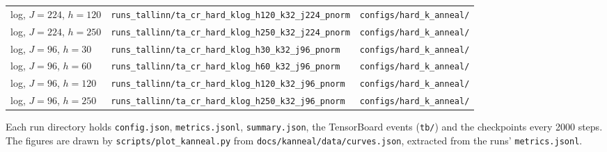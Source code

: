 \documentclass[11pt,a4paper]{article}
\newcommand{\code}[1]{\texttt{#1}}
\begin{document}
\begin{center}
\begin{tabular}{lll}
log, $J = 224$, $h = 120$ & \code{runs\_tallinn/ta\_cr\_hard\_klog\_h120\_k32\_j224\_pnorm} & \code{configs/hard\_k\_anneal/} \\
log, $J = 224$, $h = 250$ & \code{runs\_tallinn/ta\_cr\_hard\_klog\_h250\_k32\_j224\_pnorm} & \code{configs/hard\_k\_anneal/} \\
log, $J = 96$, $h = 30$ & \code{runs\_tallinn/ta\_cr\_hard\_klog\_h30\_k32\_j96\_pnorm} & \code{configs/hard\_k\_anneal/} \\
log, $J = 96$, $h = 60$ & \code{runs\_tallinn/ta\_cr\_hard\_klog\_h60\_k32\_j96\_pnorm} & \code{configs/hard\_k\_anneal/} \\
log, $J = 96$, $h = 120$ & \code{runs\_tallinn/ta\_cr\_hard\_klog\_h120\_k32\_j96\_pnorm} & \code{configs/hard\_k\_anneal/} \\
log, $J = 96$, $h = 250$ & \code{runs\_tallinn/ta\_cr\_hard\_klog\_h250\_k32\_j96\_pnorm} & \code{configs/hard\_k\_anneal/} \\
\bottomrule
\end{tabular}
\end{center}

Each run directory holds \code{config.json}, \code{metrics.jsonl},
\code{summary.json}, the TensorBoard events (\code{tb/}) and the checkpoints
every 2000 steps. The figures are drawn by \code{scripts/plot\_kanneal.py}
from \code{docs/kanneal/data/curves.json}, extracted from the runs'
\code{metrics.jsonl}.
\end{document}
